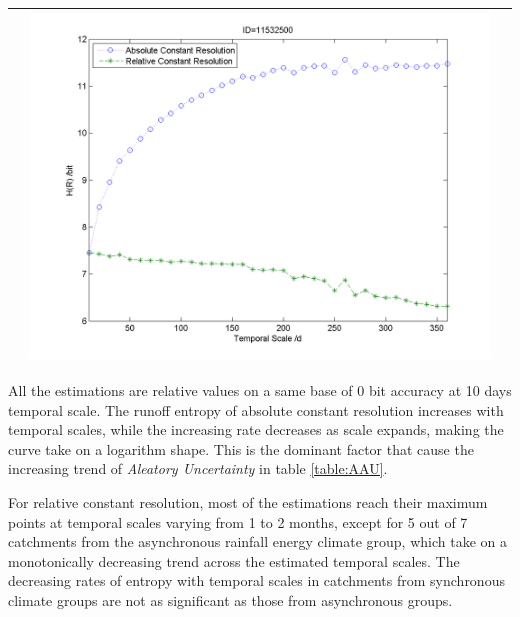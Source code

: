 \documentclass[11pt]{article}
\begin{document}
\begin{table}[H]
{\begin{tabular}{ccc}
&\begin{minipage}{.6\textwidth}\includegraphics[width=\linewidth]{resultgraph/e11532500.png}\end{minipage}
\\
\bottomrule
\end{tabular}
}
\end{table}




All the estimations are relative values on a same base of 0 bit accuracy at 10 days temporal scale. The runoff entropy of absolute constant resolution increases with temporal scales, while the increasing rate decreases as scale expands, making the  curve take on a logarithm shape. This is the dominant factor that cause the increasing trend of \emph{Aleatory Uncertainty} in table \ref{table:AAU}. 

For relative constant resolution, most of the estimations reach their maximum points at temporal scales varying from    
1 to 2 months, except for 5 out of 7 catchments from the asynchronous rainfall energy climate group, which take on a monotonically decreasing trend across the estimated temporal scales. The decreasing rates of entropy with temporal scales in catchments from synchronous climate groups are not as significant as those from asynchronous groups. 
 
\end{document}
